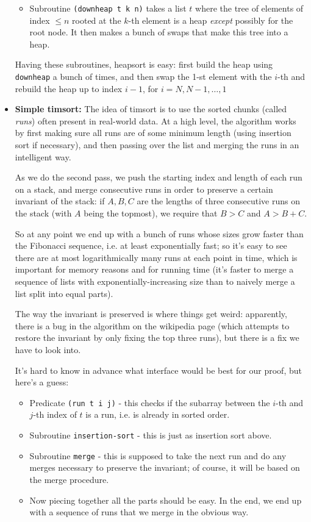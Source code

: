 \documentclass{article}
\begin{document}
\begin{itemize}
\begin{itemize}
	\item Subroutine \verb|(downheap t k n)| takes a list $t$ where the tree of elements of index $\leq n$ rooted at the $k$-th element is a heap \emph{except} possibly for the root node. It then makes a bunch of swaps that make this tree into a heap. 
\end{itemize}
Having these subroutines, heapsort is easy: first build the heap using \verb|downheap| a bunch of times, and then swap the 1-st element with the $i$-th and rebuild the heap up to index $i-1$, for $i = N, N-1, \ldots, 1$
  \item \textbf{Simple timsort:} The idea of timsort is to use the sorted chunks (called \emph{runs}) often present in real-world data. At a high level, the algorithm works by first making sure all runs are of some minimum length (using insertion sort if necessary), and then passing over the list and merging the runs in an intelligent way. 
  
  As we do the second pass, we push the starting index and length of each run on a stack, and merge consecutive runs in order to preserve a certain invariant of the stack:  if $A,B,C$ are the lengths of three consecutive runs on the stack (with $A$ being the topmost), we require that $B>C$ and $A>B+C$.  
  
  So at any point we end up with a bunch of runs whose sizes grow faster than the Fibonacci sequence, i.e. at least exponentially fast; so it's easy to see there are at most logarithmically many runs at each point in time, which is important for memory reasons and for running time (it's faster to merge a sequence of lists with exponentially-increasing size than to naively merge a list split into equal parts).
  
  The way the invariant is preserved is where things get weird: apparently, there is a bug in the algorithm on the wikipedia page (which attempts to restore the invariant by only fixing the top three runs), but there is a fix \cite{deopenjdk} we have to look into.
  
  It's hard to know in advance what interface would be best for our proof, but here's a guess:
  	\begin{itemize}
  	\item Predicate \verb|(run t i j)| - this checks if the subarray between the $i$-th and $j$-th index of $t$ is a run, i.e. is already in sorted order.
	\item Subroutine \verb|insertion-sort| - this is just as insertion sort above.
	\item Subroutine \verb|merge| - this is supposed to take the next run and do any merges necessary to preserve the invariant; of course, it will be based on the merge procedure.
	\item Now piecing together all the parts should be easy. In the end, we end up with a sequence of runs that we merge in the obvious way.
\end{itemize}


\end{itemize}
\end{document}
